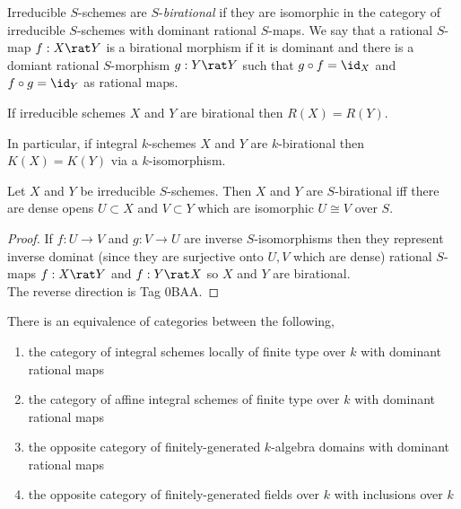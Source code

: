 \documentclass[12pt]{article}
\begin{document}
\begin{definition}
Irreducible $S$-schemes are $S$-\textit{birational} if they are isomorphic in the category of irreducible $S$-schemes with dominant rational $S$-maps. We say that a rational $S$-map $f : X \rat Y$ is a birational morphism if it is dominant and there is a domiant rational $S$-morphism $g : Y \rat Y$ such that $g \circ f = \id_X$ and $f \circ g = \id_Y$ as rational maps. 
\end{definition}

\begin{prop}
If irreducible schemes $X$ and $Y$ are birational then $R(X) = R(Y)$. 
\end{prop}

\begin{prop}
In particular, if integral $k$-schemes $X$ and $Y$ are $k$-birational then $K(X) = K(Y)$ via a $k$-isomorphism. 
\end{prop}

\begin{prop}
Let $X$ and $Y$ be irreducible $S$-schemes. Then $X$ and $Y$ are $S$-birational iff there are dense opens $U \subset X$ and $V \subset Y$ which are isomorphic $U \cong V$ over $S$.
\end{prop}

\begin{proof}
If $f : U \to V$ and $g : V \to U$ are inverse $S$-isomorphisms then they represent inverse dominat (since they are surjective onto $U,V$ which are dense) rational $S$-maps $f : X \rat Y$ and $f : Y \rat X$ so $X$ and $Y$ are birational.
\bigskip\\
The reverse direction is Tag 0BAA.
\end{proof}

\begin{theorem}
There is an equivalence of categories between the following,
\begin{enumerate}
\item the category of integral schemes locally of finite type over $k$ with dominant rational maps
\item the category of affine integral schemes of finite type over $k$ with dominant rational maps
\item the opposite category of finitely-generated $k$-algebra domains with dominant rational maps
\item the opposite category of finitely-generated fields over $k$ with inclusions over $k$
\end{enumerate}
\end{theorem}
\end{document}

